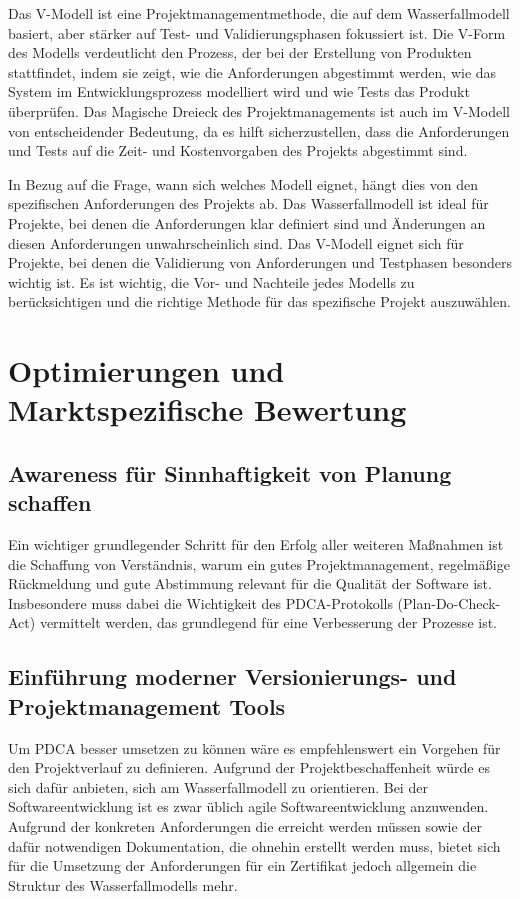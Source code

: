Das V-Modell ist eine Projektmanagementmethode, die auf dem Wasserfallmodell basiert, aber stärker auf Test- und Validierungsphasen fokussiert ist. Die V-Form des Modells verdeutlicht den Prozess, der bei der Erstellung von Produkten stattfindet, indem sie zeigt, wie die Anforderungen abgestimmt werden, wie das System im Entwicklungsprozess modelliert wird und wie Tests das Produkt überprüfen. Das Magische Dreieck des Projektmanagements ist auch im V-Modell von entscheidender Bedeutung, da es hilft sicherzustellen, dass die Anforderungen und Tests auf die Zeit- und Kostenvorgaben des Projekts abgestimmt sind.

In Bezug auf die Frage, wann sich welches Modell eignet, hängt dies von den spezifischen Anforderungen des Projekts ab. Das Wasserfallmodell ist ideal für Projekte, bei denen die Anforderungen klar definiert sind und Änderungen an diesen Anforderungen unwahrscheinlich sind. Das V-Modell eignet sich für Projekte, bei denen die Validierung von Anforderungen und Testphasen besonders wichtig ist. Es ist wichtig, die Vor- und Nachteile jedes Modells zu berücksichtigen und die richtige Methode für das spezifische Projekt auszuwählen.

\section{Optimierungen und Marktspezifische Bewertung}

\subsection{Awareness für Sinnhaftigkeit von Planung schaffen}

Ein wichtiger grundlegender Schritt für den Erfolg aller weiteren Maßnahmen ist die Schaffung von Verständnis, warum ein gutes Projektmanagement, regelmäßige Rückmeldung und gute Abstimmung relevant für die Qualität der Software ist. 
Insbesondere muss dabei die Wichtigkeit des PDCA-Protokolls (Plan-Do-Check-Act) vermittelt werden, das grundlegend für eine Verbesserung der Prozesse ist.

\subsection{Einführung moderner Versionierungs- und Projektmanagement Tools}

Um PDCA besser umsetzen zu können wäre es empfehlenswert ein Vorgehen für den Projektverlauf zu definieren.
Aufgrund der Projektbeschaffenheit würde es sich dafür anbieten, sich am Wasserfallmodell zu orientieren. Bei der Softwareentwicklung ist es zwar üblich agile Softwareentwicklung anzuwenden.
Aufgrund der konkreten Anforderungen die erreicht werden müssen sowie der dafür notwendigen Dokumentation, die ohnehin erstellt werden muss, bietet sich für die Umsetzung der Anforderungen für ein Zertifikat jedoch allgemein die Struktur des Wasserfallmodells mehr.

